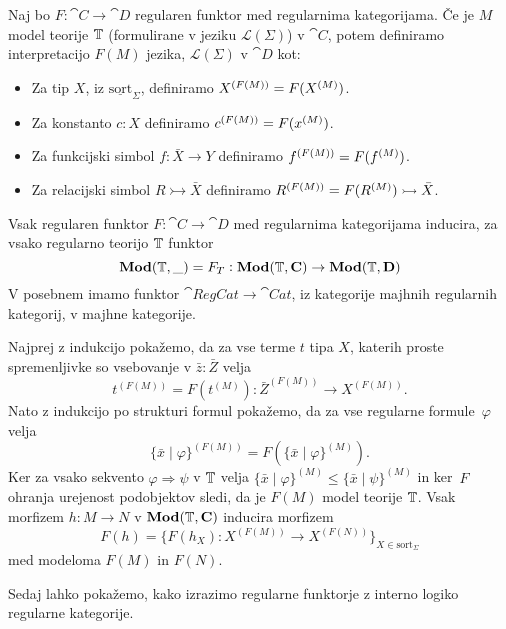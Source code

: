 \documentclass[../kategoricna_logika.tex]{subfiles}
\begin{document}
\begin{definicija}
  Naj bo $F : \cat{C} \to \cat{D}$ regularen funktor med regularnima
  kategorijama.  Če je $M$ model teorije $\T$ (formulirane v jeziku
  $\mathcal{L}(\Sigma)$) v $\cat{C}$, potem definiramo interpretacijo
  $F(M)$ jezika, $\mathcal{L}(\Sigma)$ v $\cat{D}$ kot:
  \begin{itemize}
  \item Za tip $X$, iz $\underline{\mathrm{sort}}_\Sigma$, definiramo
    $\interp[F(M)]{X} = F(\interp{X})$.
  \item Za konstanto $c:X$ definiramo
    $\interp[F(M)]{c} = F(\interp{x})$.
  \item Za funkcijski simbol $f : \bar{X} \to Y$ definiramo
    $\interp[F(M)]{f} = F(\interp{f})$.
  \item Za relacijski simbol $R \rightarrowtail \bar{X}$ definiramo
    $\interp[F(M)]{R} = F(\interp{R}) \rightarrowtail \bar{X}$.
  \end{itemize}
\end{definicija}
\begin{lema}\label{lema:regularen-funktor-slika-model-v-model}
  Vsak regularen funktor $F : \cat{C} \to \cat{D}$ med regularnima
  kategorijama inducira, za vsako regularno teorijo $\T$ funktor
  $$\Mod(\T, \_)=F_T : \Mod(\T,\cat{C}) \to \Mod(\T, \cat{D})$$
  V posebnem imamo funktor $\cat{RegCat} \to \cat{Cat}$, iz kategorije
  majhnih regularnih kategorij, v majhne kategorije.
\end{lema}
\begin{dokaz}
  Najprej z indukcijo pokažemo, da za vse terme $t$ tipa $X$, katerih
  proste spremenljivke so vsebovanje v $\bar{z} : \bar{Z}$ velja
  \[ t^{(F(M))} = F(t^{(M)}) : \bar{Z}^{(F(M))} \to X^{(F(M))}.\] Nato
  z indukcijo po strukturi formul pokažemo, da za vse regularne
  formule~$\varphi$ velja
  \[ \{ \bar{x} \mid \varphi\}^{(F(M))} = F(\{\bar{x} \mid \varphi
    \}^{(M)}).\] Ker za vsako sekvento $\varphi \Rightarrow \psi$ v
  $\T$ velja
  $\{\bar{x} \mid \varphi\}^{(M)} \leq \{\bar{x} \mid \psi \}^{(M)}$
  in ker~$F$ ohranja urejenost podobjektov sledi, da je $F(M)$ model
  teorije $\T$. Vsak morfizem $h : M \to N$ v $\Mod(\T, \cat{C})$
  inducira morfizem
  \[ F(h) = \{ F(h_X) : X^{(F(M))} \to X^{(F(N))}\}_{X \in
      \mathrm{sort}_{\Sigma}}\] med modeloma $F(M)$ in $F(N)$.
\end{dokaz}
Sedaj lahko pokažemo, kako izrazimo regularne funktorje z interno
logiko regularne kategorije.
\end{document}
